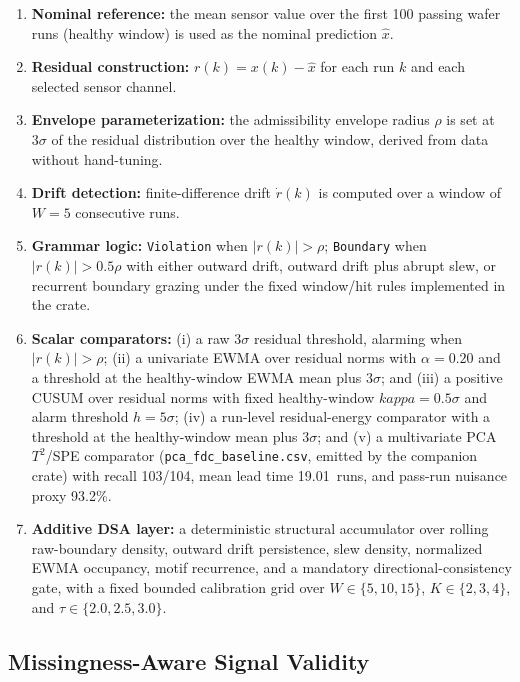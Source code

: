 \documentclass[11pt,letterpaper]{article}
\theoremstyle{scresult}
\begin{document}
\begin{enumerate}
  \item \textbf{Nominal reference:} the mean sensor value over the first
        100 passing wafer runs (healthy window) is used as the nominal
        prediction $\hat{x}$.
  \item \textbf{Residual construction:} $r(k) = x(k) - \hat{x}$ for each
        run $k$ and each selected sensor channel.
  \item \textbf{Envelope parameterization:} the admissibility envelope radius
        $\rho$ is set at $3\sigma$ of the residual distribution over the
        healthy window, derived from data without hand-tuning.
  \item \textbf{Drift detection:} finite-difference drift $\dot{r}(k)$ is
        computed over a window of $W = 5$ consecutive runs.
  \item \textbf{Grammar logic:} \texttt{Violation} when $|r(k)| > \rho$;
        \texttt{Boundary} when $|r(k)| > 0.5\rho$ with either outward drift,
        outward drift plus abrupt slew, or recurrent boundary grazing under
        the fixed window/hit rules implemented in the crate.
  \item \textbf{Scalar comparators:} (i) a raw $3\sigma$ residual threshold,
        alarming when $|r(k)| > \rho$; (ii) a univariate EWMA over residual
        norms with $\alpha = 0.20$ and a threshold at the healthy-window EWMA
        mean plus $3\sigma$; and (iii) a positive CUSUM over residual norms
        with fixed healthy-window $kappa = 0.5\sigma$ and alarm threshold
        $h = 5\sigma$; (iv) a run-level residual-energy comparator with a
        threshold at the healthy-window mean plus $3\sigma$; and (v) a
        multivariate PCA $T^2$/SPE comparator (\texttt{pca\_fdc\_baseline.csv},
        emitted by the companion crate) with recall 103/104, mean lead time
        19.01~runs, and pass-run nuisance proxy 93.2\%.
  \item \textbf{Additive DSA layer:} a deterministic structural accumulator
        over rolling raw-boundary density, outward drift persistence, slew
        density, normalized EWMA occupancy, motif recurrence, and a mandatory
        directional-consistency gate, with a fixed bounded calibration grid
        over $W \in \{5,10,15\}$, $K \in \{2,3,4\}$, and
        $\tau \in \{2.0,2.5,3.0\}$.
\end{enumerate}

\subsection{Missingness-Aware Signal Validity}
\end{document}
